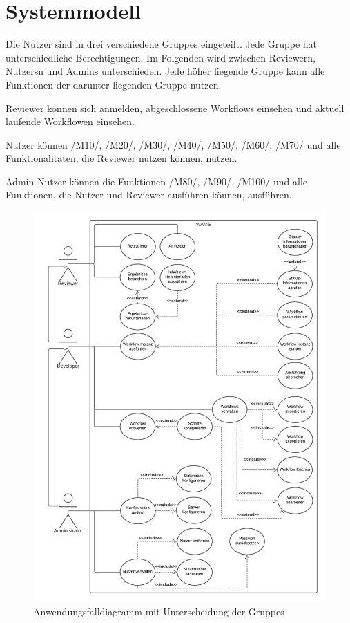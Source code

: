 \chapter{Systemmodell}
Die Nutzer sind in drei verschiedene \glspl{Gruppe} eingeteilt. Jede Gruppe hat unterschiedliche Berechtigungen. Im Folgenden wird zwischen \gls{Reviewer}n, \glspl{Nutzer}n und \glspl{Admin} unterschieden.
Jede höher liegende Gruppe kann alle Funktionen der darunter liegenden Gruppe nutzen.

\gls{Reviewer} können sich anmelden, abgeschlossene Workflows einsehen und aktuell laufende \gls{Workflow}en einsehen.

\gls{Nutzer} können /M10/, /M20/, /M30/, /M40/, /M50/, /M60/, /M70/ und alle Funktionalitäten, die \gls{Reviewer} nutzen können, nutzen.

\gls{Admin} Nutzer können die Funktionen /M80/, /M90/, /M100/ und alle Funktionen, die \gls{Nutzer} und \gls{Reviewer} ausführen können, ausführen.


\begin{figure}[ht]
    \centering
    \includegraphics[width = \textwidth]{Grafiken/Diagramme/Anwendungsfalldiagramm.png}
    \caption{Anwendungsfalldiagramm mit Unterscheidung der \glspl{Gruppe} }
    \label{fig:Anwfalldiag}
\end{figure}